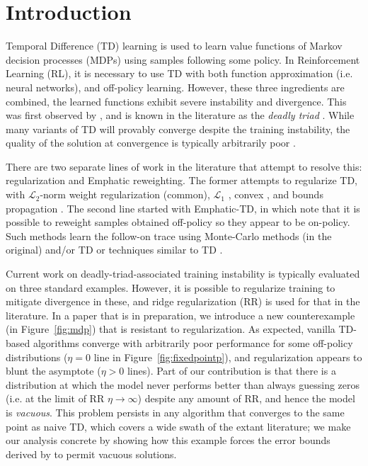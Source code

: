 \documentclass[11pt]{article}
\begin{document}
\vfill

\clearpage

\tableofcontents

\clearpage

\linenumbers

\section{Introduction}

Temporal Difference (TD) learning is used to learn value functions of Markov decision processes (MDPs) using samples following some policy. In Reinforcement Learning (RL), it is necessary to use TD with both function approximation (i.e. neural networks), and off-policy learning. However, these three ingredients are combined, the learned functions exhibit severe instability and divergence. This was first observed by \citet{tsitsiklis1996analysis}, and is known in the literature as the \emph{deadly triad} \cite[p.~264]{sutton2020reinforcement}. While many variants of TD will provably converge despite the training instability, the quality of the solution at convergence is typically arbitrarily poor \citep{kolter2011fixed}.

There are two separate lines of work in the literature that attempt to resolve this: regularization and Emphatic reweighting.
The former attempts to regularize TD, with $\mathcal L_2$-norm weight regularization (common), $\mathcal L_1$ \citep{mahadevan2014proximal}, convex \citep{yu2017convergence}, and bounds propagation \citep{kumar2020discor}.
The second line started with Emphatic-TD, in which \citet{sutton2016emphatic} note that it is possible to reweight samples obtained off-policy so they appear to be on-policy. Such methods learn the follow-on trace using Monte-Carlo methods (in the original) and/or TD \citep{jiang2021learning,zhang2020provably} or techniques similar to TD \citep{hasselt2021expected}.

Current work on deadly-triad-associated training instability is typically evaluated on three standard examples. However, it is possible to regularize training to mitigate divergence in these, and ridge regularization (RR) is used for that in the literature.
In a paper that is in preparation, we introduce a new counterexample (in Figure~\ref{fig:mdp}) that is resistant to regularization. As expected, vanilla TD-based algorithms converge with arbitrarily poor performance for some off-policy distributions ($\eta=0$ line in Figure~\ref{fig:fixedpointp}), and regularization appears to blunt the asymptote ($\eta > 0$ lines). Part of our contribution is that there is a distribution at which the model never performs better than always guessing zeros (i.e. at the limit of RR $\eta\to\infty$) despite any amount of RR, and hence the model is \emph{vacuous}. This problem persists in any algorithm that converges to the same point as naive TD, which covers a wide swath of the extant literature; we make our analysis concrete by showing how this example forces the error bounds derived by \citet{zhang2021breaking} to permit vacuous solutions.
\end{document}
